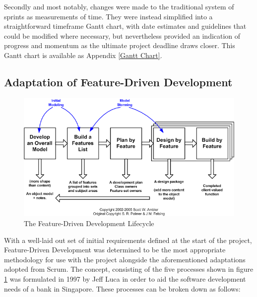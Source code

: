 Secondly and most notably, changes were made to the traditional system of sprints as measurements of time. They were instead simplified into a straightforward timeframe Gantt chart, with date estimates and guidelines that could be modified where necessary, but nevertheless provided an indication of progress and momentum as the ultimate project deadline draws closer. This Gantt chart is available as Appendix \ref{Gantt Chart}.

\subsection{Adaptation of Feature-Driven Development}
\begin{figure}[h]
    \includegraphics[width=\textwidth]{Figures/fdd}
    \caption{The Feature-Driven Development Lifecycle}
    \label{fig:fdd1}
\end{figure}

With a well-laid out set of initial requirements defined at the start of the project, Feature-Driven Development was determined to be the most appropriate methodology for use with the project alongside the aforementioned adaptations adopted from Scrum. The concept, consisting of the five processes shown in figure \ref{fig:fdd1} was formulated in 1997 by Jeff Luca in order to aid the software development needs of a bank in Singapore. \cite{Arrk1} These processes can be broken down as follows:

